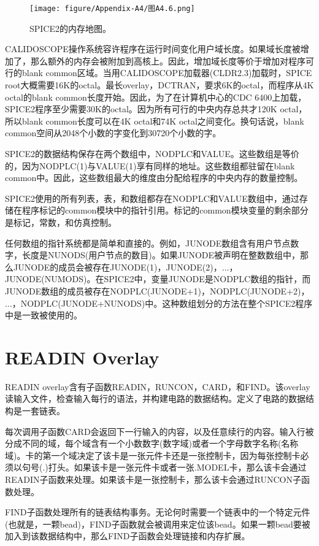 \begin{figure}[htbp]
\small
    \centering
    \texttt{[image: figure/Appendix-A4/图A4.6.png]}
    \caption{SPICE2的内存地图。}
    \label{图A4.6}
\end{figure}

CALIDOSCOPE操作系统容许程序在运行时间变化用户域长度。如果域长度被增加了，那么额外的内存会被附加到高核上。因此，增加域长度等价于增加对程序可行的blank common区域。当用CALIDOSCOPE加载器(CLDR2.3)加载时，SPICE root大概需要16K的octal。最长overlay，DCTRAN，要求6K的octal，而程序从4K octal的blank common长度开始。因此，为了在计算机中心的CDC 6400上加载，SPICE2程序至少需要30K的octal。因为所有可行的中央内存总共才120K octal，所以blank common长度可以在4K octal和74K octal之间变化。换句话说，blank common空间从2048个小数的字变化到30720个小数的字。

SPICE2的数据结构保存在两个数组中，NODPLC和VALUE。这些数组是等价的，因为NODPLC(1)与VALUE(1)享有同样的地址。这些数组都驻留在blank common中。因此，这些数组最大的维度由分配给程序的中央内存的数量控制。

SPICE2使用的所有列表，表，和数组都存在NODPLC和VALUE数组中，通过存储在程序标记的common模块中的指针引用。标记的common模块变量的剩余部分是标记，常数，和仿真控制。

任何数组的指针系统都是简单和直接的。例如，JUNODE数组含有用户节点数字，长度是NUNODS(用户节点的数目)。如果JUNODE被声明在整数数组中，那么JUNODE的成员会被存在JUNODE(1)，JUNODE(2)，$\dots$，JUNODE(NUMODS)。在SPICE2中，变量JUNODE是NODPLC数组的指针，而JUNODE数组的成员被存在NODPLC(JUNODE+1)，NODPLC(JUNODE+2)，$\dots$，NODPLC(JUNODE+NUNODS)中。这种数组划分的方法在整个SPICE2程序中是一致被使用的。

\section{READIN Overlay}
READIN overlay含有子函数READIN，RUNCON，CARD，和FIND。该overlay读输入文件，检查输入每行的语法，并构建电路的数据结构。定义了电路的数据结构是一套链表。 

每次调用子函数CARD会返回下一行输入的内容，以及任意续行的内容。输入行被分成不同的域，每个域含有一个小数数字(数字域)或者一个字母数字名称(名称域)。卡的第一个域决定了该卡是一张元件卡还是一张控制卡，因为每张控制卡必须以句号(.)打头。如果该卡是一张元件卡或者一张.MODEL卡，那么该卡会通过READIN子函数来处理。如果该卡是一张控制卡，那么该卡会通过RUNCON子函数处理。

FIND子函数处理所有的链表结构事务。无论何时需要一个链表中的一个特定元件(也就是，一颗bead)，FIND子函数就会被调用来定位该bead。如果一颗bead要被加入到该数据结构中，那么FIND子函数会处理链接和内存扩展。

